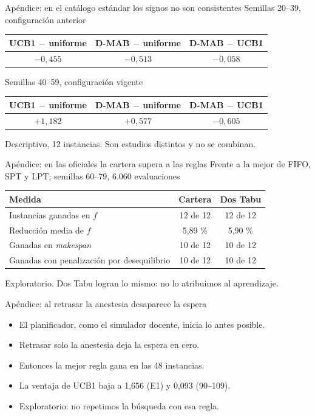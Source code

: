 \documentclass[aspectratio=169,11pt]{beamer}
\begin{document}
\begin{frame}{Apéndice: en el catálogo estándar los signos no son consistentes}
  \centering\footnotesize
  Semillas 20--39, configuración anterior\par\smallskip
  \begin{tabular}{@{}ccc@{}}
    \toprule
    UCB1 $-$ uniforme & D-MAB $-$ uniforme & D-MAB $-$ UCB1\\
    \midrule
    $-0{,}455$ & $-0{,}513$ & $-0{,}058$\\
    \bottomrule
  \end{tabular}

  \bigskip
  Semillas 40--59, configuración vigente\par\smallskip
  \begin{tabular}{@{}ccc@{}}
    \toprule
    UCB1 $-$ uniforme & D-MAB $-$ uniforme & D-MAB $-$ UCB1\\
    \midrule
    $+1{,}182$ & $+0{,}577$ & $-0{,}605$\\
    \bottomrule
  \end{tabular}

  \bigskip
  {\scriptsize Descriptivo, 12 instancias. Son estudios distintos y no se combinan.}
\end{frame}

\begin{frame}{Apéndice: en las oficiales la cartera supera a las reglas}
  \centering\footnotesize
  Frente a la mejor de FIFO, SPT y LPT; semillas 60--79, 6.060 evaluaciones\par\smallskip
  \begin{tabular}{@{}lcc@{}}
    \toprule
    Medida & Cartera & Dos Tabu\\
    \midrule
    Instancias ganadas en $f$ & 12 de 12 & 12 de 12\\
    Reducción media de $f$ & 5,89 \% & 5,90 \%\\
    Ganadas en \emph{makespan} & 10 de 12 & 10 de 12\\
    Ganadas con penalización por desequilibrio & 10 de 12 & 10 de 12\\
    \bottomrule
  \end{tabular}

  \bigskip
  {\scriptsize Exploratorio. Dos Tabu logran lo mismo: no lo atribuimos al aprendizaje.}
\end{frame}

\begin{frame}{Apéndice: al retrasar la anestesia desaparece la espera}
  \begin{itemize}
    \item El planificador, como el simulador docente, inicia lo antes posible.
    \item Retrasar solo la anestesia deja la espera en cero.
    \item Entonces la mejor regla gana en las 48 instancias.
    \item La ventaja de UCB1 baja a 1,656 (E1) y 0,093 (90--109).
    \item Exploratorio: no repetimos la búsqueda con esa regla.
  \end{itemize}
\end{frame}
\end{document}
